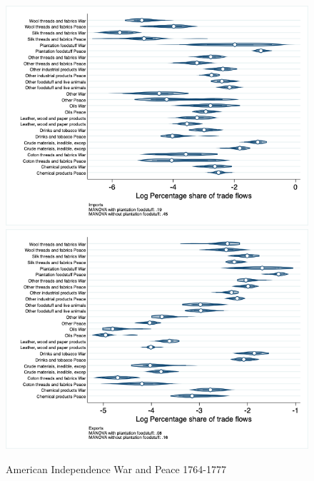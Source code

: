 \documentclass[12pt,a4paper,notitlepage,english]{article}
\begin{document}
\begin{figure}
\centering
\caption{American Independence War and Peace 1764-1777}
\label{peace1764_1777_indep_nat_distr}
\includegraphics[scale=.4]{peace1764_1777_indep_nat_distr_I}
\includegraphics[scale=.4]{peace1764_1777_indep_nat_distr_X}
\end{figure}
\end{document}
